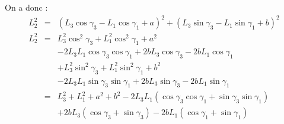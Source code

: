 \documentclass[10pt,fleqn]{article} %
\begin{document}
\begin{multicols}{2}
\begin{corrige}
On a donc : 
\begin{eqnarray*}
L_2^2 &=& \left( L_3\cos\gamma_{3}- L_1 \cos\gamma_{1} + a  \right)^2
+ \left( L_3 \sin\gamma_{3}-L_1 \sin\gamma_{1} + b\right)^2 \\
L_2^2 &=& 
L_3^2\cos^2\gamma_{3}+ L_1^2 \cos^2\gamma_{1} + a^2 \\
&&-2  L_3 L_1\cos\gamma_{3} \cos\gamma_{1}
+2 b L_3 \cos\gamma_{3}
-2bL_1 \cos\gamma_{1}\\
&&+L_3^2 \sin^2\gamma_{3}+ L_1^2 \sin^2\gamma_{1} + b^2 \\
&&-2  L_3 L_1 \sin\gamma_{3} \sin\gamma_{1}
+2 b L_3 \sin\gamma_{3}
-2bL_1 \sin\gamma_{1}\\
& = & L_3^2+ L_1^2  + a^2+ b^2  
-2  L_3 L_1\left( \cos\gamma_{3} \cos\gamma_{1} + \sin\gamma_{3} \sin\gamma_{1} \right)\\
&& +2 b L_3 \left( \cos\gamma_{3} + \sin\gamma_{3}\right)
-2bL_1 \left( \cos\gamma_{1} + \sin\gamma_{1}\right)\\
\end{eqnarray*}
\end{corrige}
\else \fi





\ifprof
\else
\end{multicols}
\fi

\end{document}
